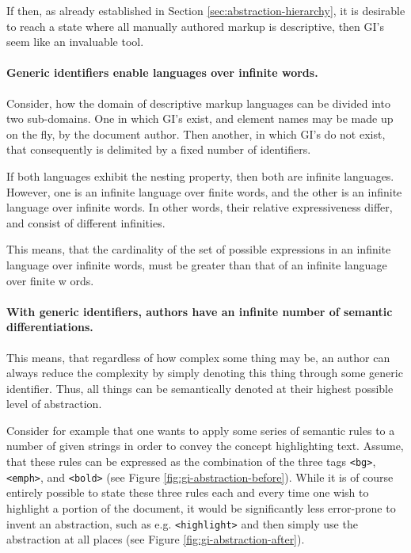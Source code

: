 \documentclass{scrreprt}
\begin{document}
If then, as already established in Section \ref{sec:abstraction-hierarchy}, it is desirable to reach a state where all manually authored markup is descriptive, then GI's seem like an invaluable tool.

\paragraph{Generic identifiers enable languages over infinite words.}
Consider, how the domain of descriptive markup languages can be divided into two sub-domains. One in which GI's exist, and element names may be made up on the fly, by the document author. Then another, in which GI's do not exist, that consequently is delimited by a fixed number of identifiers.

If both languages exhibit the nesting property, then both are infinite languages. However, one is an infinite language over finite words, and the other is an infinite language over infinite words. In other words, their relative expressiveness differ, and consist of different infinities.

This means, that the cardinality of the set of possible expressions in an infinite language over infinite words, must be greater than that of an infinite language over finite w ords.

\paragraph{With generic identifiers, authors have an infinite number of semantic differentiations. }
This means, that regardless of how complex some thing may be, an author can always reduce the complexity by simply denoting this thing through some generic identifier. Thus, all things can be semantically denoted at their highest possible level of abstraction.

Consider for example that one wants to apply some series of semantic rules to a number of given strings in order to convey the concept highlighting text. Assume, that these rules can be expressed as the combination of the three tags \texttt{<bg>}, \texttt{<emph>}, and \texttt{<bold>} (see Figure \ref{fig:gi-abstraction-before}). While it is of course entirely possible to state these three rules each and every time one wish to highlight a portion of the document, it would be significantly less error-prone to invent an abstraction, such as e.g. \texttt{<highlight>} and then simply use the abstraction at all places (see Figure \ref{fig:gi-abstraction-after}).
\end{document}
